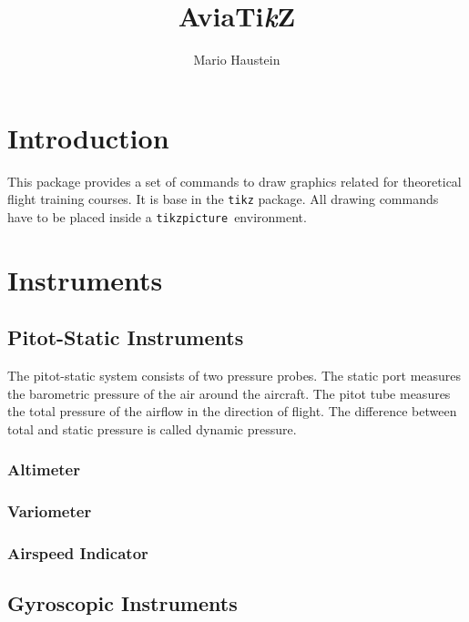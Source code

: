 \documentclass[11pt,a4paper]{article}
\title{AviaTi\textit{k}Z}
\author{Mario Haustein}
\begin{document}
\maketitle
\tableofcontents

\section{Introduction}

This package provides a set of commands to draw graphics related for
theoretical flight training courses. It is base in the \texttt{tikz} package.
All drawing commands have to be placed inside a
\texttt{tikzpicture}~environment.

\section{Instruments}


\subsection{Pitot-Static Instruments}

The pitot-static system consists of two pressure probes. The static port
measures the barometric pressure of the air around the aircraft. The pitot tube
measures the total pressure of the airflow in the direction of flight. The
difference between total and static pressure is called dynamic pressure.

\subsubsection{Altimeter}


\subsubsection{Variometer}


\subsubsection{Airspeed Indicator}


\subsection{Gyroscopic Instruments}
\end{document}
